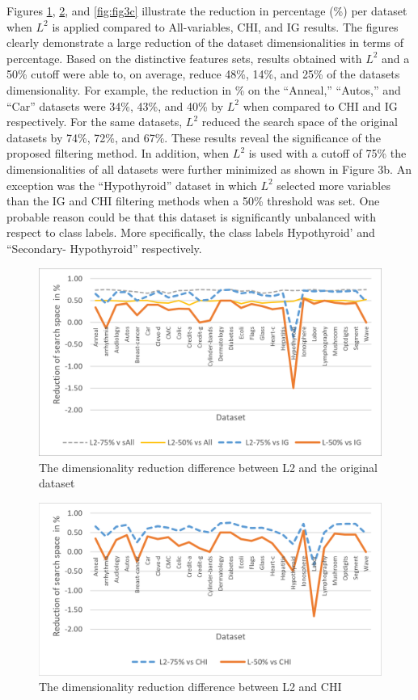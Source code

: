 \documentclass[review]{elsarticle}
\begin{document}
Figures \ref{fig:fig3a}, \ref{fig:fig3b}, and \ref{fig:fig3c} illustrate the reduction in percentage (\%) per dataset when $ L^2 $ is applied compared to All-variables, CHI, and IG results. The figures clearly demonstrate a large reduction of the dataset dimensionalities in terms of percentage. Based on the distinctive features sets, results obtained with $ L^2 $ and a 50\% cutoff were able to, on average, reduce 48\%, 14\%, and 25\% of the datasets dimensionality. For example, the reduction in \% on the “Anneal,” “Autos,” and “Car” datasets were 34\%, 43\%, and 40\% by $ L^2 $ when compared to CHI and IG respectively. For the same datasets, $ L^2 $ reduced the search space of the original datasets by 74\%, 72\%, and 67\%. These results reveal the significance of the proposed filtering method. In addition, when $ L^2 $ is used with a cutoff of 75\% the dimensionalities of all datasets were further minimized as shown in Figure 3b.  An exception was the “Hypothyroid” dataset in which $ L^2 $ selected more variables than the IG and CHI filtering methods when a 50\% threshold was set. One probable reason could be that this dataset is significantly unbalanced with respect to class labels. More specifically, the class labels Hypothyroid’ and “Secondary- Hypothyroid” respectively. 

\begin{figure}[h]
	\centering
	\includegraphics[width=0.8\linewidth]{figs/fig_3a}
	\caption[fig 3a]{The dimensionality reduction difference between L2 and the original dataset}
	\label{fig:fig3a}
\end{figure}


\begin{figure}[h]
	\centering
	\includegraphics[width=0.8\linewidth]{figs/fig_3b}
	\caption[fig 3b]{The dimensionality reduction difference between L2 and CHI}
	\label{fig:fig3b}
\end{figure}
\end{document}
